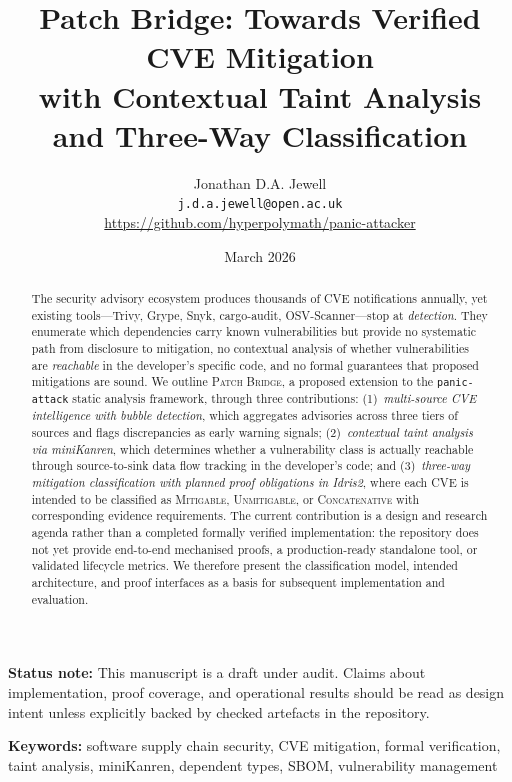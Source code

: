 \documentclass[11pt,twocolumn]{article}
\title{\textbf{Patch Bridge: Towards Verified CVE Mitigation\\
with Contextual Taint Analysis\\and Three-Way Classification}}
\author{
  Jonathan D.A. Jewell\\
  \texttt{j.d.a.jewell@open.ac.uk}\\
  \url{https://github.com/hyperpolymath/panic-attacker}
}
\date{March 2026}
\begin{document}
\maketitle

\begin{abstract}
The security advisory ecosystem produces thousands of CVE notifications
annually, yet existing tools---Trivy, Grype, Snyk, cargo-audit, OSV-Scanner---stop
at \emph{detection}. They enumerate which dependencies carry known
vulnerabilities but provide no systematic path from disclosure to
mitigation, no contextual analysis of whether vulnerabilities are
\emph{reachable} in the developer's specific code, and no formal
guarantees that proposed mitigations are sound. We outline \textsc{Patch
Bridge}, a proposed extension to the \texttt{panic-attack} static
analysis framework, through three contributions:
(1)~\emph{multi-source CVE intelligence with bubble detection}, which
aggregates advisories across three tiers of sources and flags
discrepancies as early warning signals;
(2)~\emph{contextual taint analysis via miniKanren}, which determines
whether a vulnerability class is actually reachable through
source-to-sink data flow tracking in the developer's code; and
(3)~\emph{three-way mitigation classification with planned proof
obligations in Idris2}, where each CVE is intended to be classified as
\textsc{Mitigable}, \textsc{Unmitigable}, or \textsc{Concatenative}
with corresponding evidence requirements. The current contribution is a
design and research agenda rather than a completed formally verified
implementation: the repository does not yet provide end-to-end
mechanised proofs, a production-ready standalone tool, or validated
lifecycle metrics. We therefore present the classification model,
intended architecture, and proof interfaces as a basis for subsequent
implementation and evaluation.
\end{abstract}

\noindent\textbf{Status note:} This manuscript is a draft under audit. Claims
about implementation, proof coverage, and operational results should be read as
design intent unless explicitly backed by checked artefacts in the repository.

\noindent\textbf{Keywords:} software supply chain security, CVE
mitigation, formal verification, taint analysis, miniKanren, dependent
types, SBOM, vulnerability management
\end{document}
